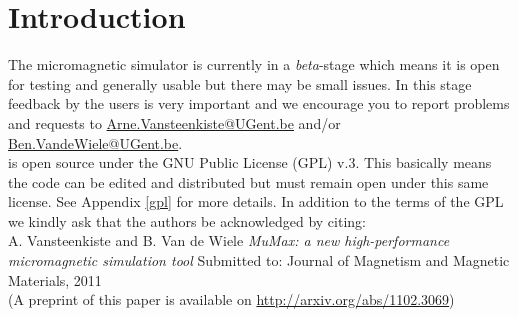 \section*{Introduction}

The \mumax micromagnetic simulator is currently in a \emph{beta}-stage which means it is open for testing and generally usable but there may be small issues. In this stage feedback by the users is very important and we encourage you to report problems and requests to \url{Arne.Vansteenkiste@UGent.be} and/or \url{Ben.VandeWiele@UGent.be}.\\


\mumax is open source under the GNU Public License (GPL) v.3. This basically means the code can be edited and distributed but must remain open under this same license. See Appendix \ref{gpl} for more details. In addition to the terms of the GPL we kindly ask that the \mumax authors be acknowledged by citing:\\

A. Vansteenkiste and B. Van de Wiele \textit{MuMax: a new high-performance micromagnetic simulation tool} Submitted to: Journal of Magnetism and Magnetic Materials, 2011\\

(A preprint of this paper is available on \url{http://arxiv.org/abs/1102.3069})

